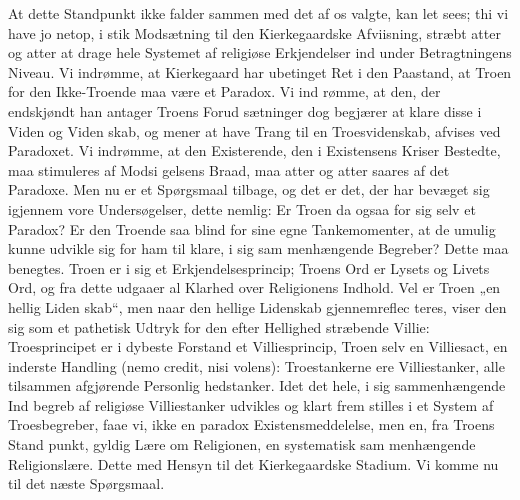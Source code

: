 \documentclass[12pt]{book}
\newcommand{\opage}[1]{\marginnote{\footnotesize\textit{[#1]}}}
\begin{document}
At dette Standpunkt ikke falder sammen med det
af os valgte, kan let sees; thi vi have jo netop, i stik
Modsætning til den Kierkegaardske Afviisning, stræbt atter
og atter at drage hele Systemet af religiøse Erkjendelser
ind under Betragtningens Niveau. Vi indrømme, at
Kierkegaard har ubetinget Ret i den Paastand, at Troen
for den Ikke-Troende maa være et Paradox. Vi ind\-%
rømme, at den, der endskjøndt han antager Troens Forud\-%
sætninger dog begjærer at klare disse i Viden og Viden\-%
skab, og mener at have Trang til en Troesvidenskab, afvises
ved Paradoxet. Vi indrømme, at den Existerende, den i
Existensens Kriser Bestedte, maa stimuleres af Modsi\-%
gelsens Braad, maa atter og atter saares af det Paradoxe.
Men nu er et Spørgsmaal tilbage, og det er det, der har
bevæget sig igjennem vore Undersøgelser, dette nemlig:
Er Troen da ogsaa for sig selv et Paradox? Er den
Troende saa blind for sine egne Tankemomenter, at de
umulig kunne udvikle sig for ham til klare, i sig sam\-%
menhængende Begreber? Dette maa benegtes. Troen
er i sig et Erkjendelsesprincip; Troens Ord er Lysets
og Livets Ord, og fra dette udgaaer al Klarhed over
Religionens Indhold. Vel er Troen „en hellig Liden\-%
skab“, men naar den hellige Lidenskab gjennemreflec\-%
teres, viser den sig som et pathetisk Udtryk for den efter
Hellighed stræbende Villie: Troesprincipet er i dybeste
Forstand et Villiesprincip, Troen selv en Villiesact, en
\opage{235}\setcounter{footnote}{0}%
inderste Handling (nemo credit, nisi volens): Troestankerne
ere Villiestanker, alle tilsammen afgjørende Personlig\-%
hedstanker. Idet det hele, i sig sammenhængende Ind\-%
begreb af religiøse Villiestanker udvikles og klart frem\-%
stilles i et System af Troesbegreber, faae vi, ikke en
paradox Existensmeddelelse, men en, fra Troens Stand\-%
punkt, gyldig Lære om Religionen, en systematisk sam\-%
menhængende Religionslære. Dette med Hensyn til det
Kierkegaardske Stadium. Vi komme nu til det næste
Spørgsmaal.
\end{document}
